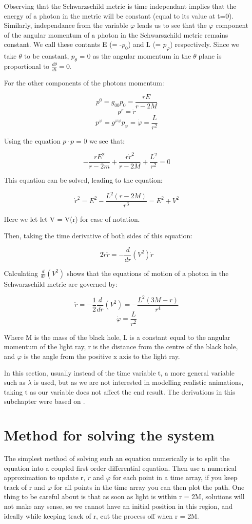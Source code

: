 \documentclass[oneside,openright,frontopenright]{dmathesis}
\begin{document}
	Observing that the Schwarzschild metric is time independant implies that the energy of a photon in the metric will be constant (equal to its value at t=0). Similarly, independance from the variable $\varphi$ leads us to see that the $\varphi$ component of the angular momentum of a photon in the Schwarszchild metric remains constant. We call these contants E (= -$p_0$) and L (= $p_\varphi$) respectively. Since we take ${\theta}$ to be constant, $p_\theta$ = 0 as the angular momentum in the $\theta$ plane is proportional to $\frac{d\theta}{dt} = 0$.

	For the other components of the photons momentum:

	\[p^0 = g_{00}p_0 = \frac{rE}{r-2M} \]
	\[p^r = \dot{r}\]
	\[p^\varphi = g^{\varphi\varphi}p_\varphi = \dot{\varphi} = \frac{L}{r^2}\]

	Using the equation $p \cdot p$ = 0 we see that:

	\[-\frac{rE^2}{r-2m}+\frac{r\dot{r}^2}{r-2M}+\frac{L^2}{r^2}=0\]

	This equation can be solved, leading to the equation:

	\[\dot{r}^2 = E^2-\frac{L^2(r-2M)}{r^3} = E^2 + V^2\]

	Here we let let V = V(r) for ease of notation.

	Then, taking the time derivative of both sides of this equation:

	\[2\dot{r}\ddot{r} = -\frac{d}{dr}(V^2)\dot{r}\]

	Calculating $\frac{d}{dr}(V^2)$ shows that the equations of motion of a photon in the Schwarzschild metric are governed by:

	\[\ddot{r} = -\frac{1}{2}\frac{d}{dr}(V^2) = -\frac{L^2(3M-r)}{r^4}\]
	\[\dot{\varphi}=\frac{L}{r^2}\]


	Where M is the mass of the black hole, L is a constant equal to the angular momentum of the light ray, r is the distance from the centre of the black hole, and $\varphi$ is the angle from the positive x axis to the light ray.

	In this section, usually instead of the time variable t, a more general variable such as $\lambda$ is used, but as we are not interested in modelling realistic animations, taking t as our variable does not affect the end result. The derivations in this subchapter were based on \cite[pg. 283-285]{schutz2009first}.

\section{Method for solving the system}
	The simplest method of solving such an equation numerically is to split the equation into a coupled first order differential equation. Then use a numerical approximation to update r, $\dot{r}$ and $\varphi$ for each point in a time array, if you keep track of r and $\varphi$ for all points in the time array you can then plot the path. One thing to be careful about is that as soon as light is within r = 2M, solutions will not make any sense, so we cannot have an initial position in this region, and ideally while keeping track of r, cut the process off when r = 2M.
\end{document}
